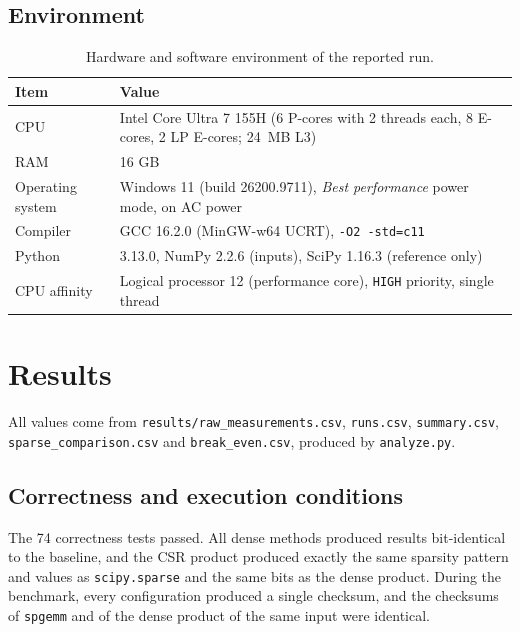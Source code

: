 \documentclass[12pt,a4paper]{report}
\begin{document}
\section{Environment}

\begin{table}[H]
\centering
\small
\caption{Hardware and software environment of the reported run.}
\label{tab:env}
\begin{tabular}{lp{10.5cm}}
\toprule
\textbf{Item} & \textbf{Value} \\
\midrule
CPU & Intel Core Ultra 7 155H (6 P-cores with 2 threads each, 8 E-cores, 2 LP E-cores; 24~MB L3) \\
RAM & 16 GB \\
Operating system & Windows 11 (build 26200.9711), \textit{Best performance} power mode, on AC power \\
Compiler & GCC 16.2.0 (MinGW-w64 UCRT), \texttt{-O2 -std=c11} \\
Python & 3.13.0, NumPy 2.2.6 (inputs), SciPy 1.16.3 (reference only) \\
CPU affinity & Logical processor 12 (performance core), \texttt{HIGH} priority, single thread \\
\bottomrule
\end{tabular}
\end{table}

\chapter{Results}
\label{chap:results}

All values come from \texttt{results/raw\_measurements.csv}, \texttt{runs.csv}, \texttt{summary.csv},
\texttt{sparse\_comparison.csv} and \texttt{break\_even.csv}, produced by \texttt{analyze.py}.

\section{Correctness and execution conditions}

The 74 correctness tests passed. All dense methods produced results bit-identical to the baseline, and the CSR
product produced exactly the same sparsity pattern and values as \texttt{scipy.sparse} and the same bits as the dense
product. During the benchmark, every configuration produced a single checksum, and the checksums of \texttt{spgemm}
and of the dense product of the same input were identical.
\end{document}
